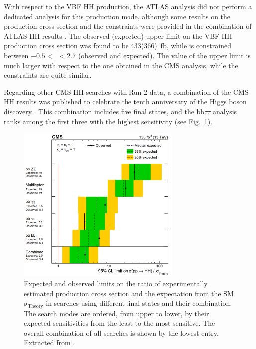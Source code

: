 \documentclass[../main.tex]{subfiles}
\begin{document}
With respect to the VBF HH production, the ATLAS analysis did not perform a dedicated analysis for this production mode, although some results on the production cross section and the \kvv{} constraints were provided in the combination of ATLAS HH results \cite{hh:analysis:atlas_comb}. The observed (expected) upper limit on the VBF HH production cross section was found to be 433(366)~fb, while \kvv{} is constrained between $-0.5<~$\kvv{}$~<2.7$ (observed and expected). The value of the upper limit is much larger with respect to the one obtained in the CMS analysis, while the \kvv{} constraints are quite similar.

Regarding other CMS HH searches with Run-2 data, a combination of the CMS HH results was published to celebrate the tenth anniversary of the Higgs boson discovery \cite{hh:analysis:nature}. This combination includes five final states, and the bb$\tau\tau$ analysis ranks among the first three with the highest sensitivity (see Fig.~\ref{hh:fig:lim_comb}). 


\begin{figure}
\begin{center}
\includegraphics[width=0.7\textwidth]{Images/CMS-HIG-22-001_Figure_005-a}
\end{center}
\caption[CMS HH production cross section results]{Expected and observed limits on the ratio of experimentally estimated production cross section and the expectation from the SM $\sigma_{\text{Theory}}$ in searches using different final states and their combination. The search modes are ordered, from upper to lower, by their expected sensitivities from the least to the most sensitive. The overall combination of all searches is shown by the lowest entry. Extracted from \cite{hh:analysis:nature}.}
\label{hh:fig:lim_comb}
\end{figure}
\end{document}

